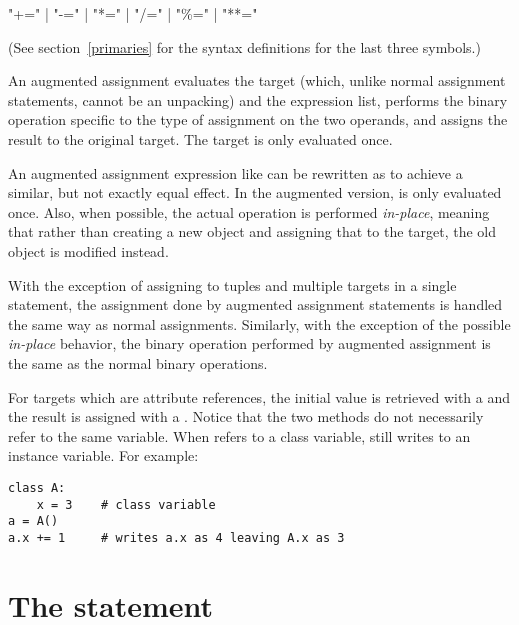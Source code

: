 \begin{productionlist}
             {  }
             {"+=" | "-=" | "*=" | "/=" | "\%=" | "**="}
\end{productionlist}

(See section~\ref{primaries} for the syntax definitions for the last
three symbols.)

An augmented assignment evaluates the target (which, unlike normal
assignment statements, cannot be an unpacking) and the expression
list, performs the binary operation specific to the type of assignment
on the two operands, and assigns the result to the original
target.  The target is only evaluated once.

An augmented assignment expression like  can be rewritten as
 to achieve a similar, but not exactly equal effect. In the
augmented version,  is only evaluated once. Also, when possible, the
actual operation is performed \emph{in-place}, meaning that rather than
creating a new object and assigning that to the target, the old object is
modified instead.

With the exception of assigning to tuples and multiple targets in a single
statement, the assignment done by augmented assignment statements is handled
the same way as normal assignments. Similarly, with the exception of the
possible \emph{in-place} behavior, the binary operation performed by
augmented assignment is the same as the normal binary operations.

For targets which are attribute references, the initial value is
retrieved with a  and the result is assigned with a
.  Notice that the two methods do not necessarily
refer to the same variable.  When  refers to a class
variable,  still writes to an instance variable.
For example:

\begin{verbatim}
class A:
    x = 3    # class variable
a = A()
a.x += 1     # writes a.x as 4 leaving A.x as 3
\end{verbatim}


\section{The  statement \label{pass}}

